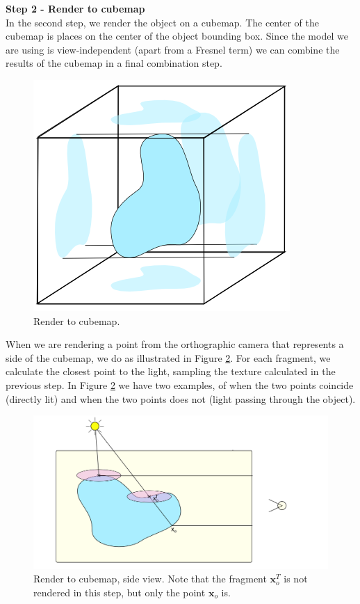 \textbf{Step 2 - Render to cubemap} \\
In the second step, we render the object on a cubemap. The center of the cubemap is places on the center of the object bounding box. Since the model we are using is view-independent (apart from a Fresnel term) we can combine the results of the cubemap in a final combination step.

\begin{figure}[!ht]
\centering
\includegraphics[width=0.5 \linewidth]{images/method/method_step2}
\caption{Render to cubemap.}
\label{fig:step2}
\end{figure} 

When we are rendering a point from the orthographic camera that represents a side of the cubemap, we do as illustrated in Figure \ref{fig:stepfrustum}. For each fragment, we calculate the closest point to the light, sampling the texture calculated in the previous step. In Figure  \ref{fig:stepfrustum} we have two examples, of when the two points coincide (directly lit) and when the two points does not (light passing through the object). 

\begin{figure}[!ht]
\centering
\includegraphics[width=\linewidth]{images/method/method_frustumside}
\caption{Render to cubemap, side view. Note that the fragment $\mathbf{x}^T_o$ is not rendered in this step, but only the point $\mathbf{x}_o$ is.}
\label{fig:stepfrustum}
\end{figure} 


